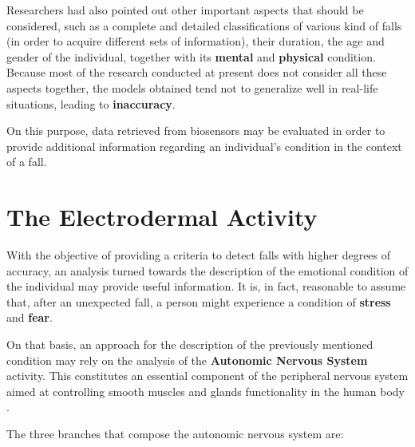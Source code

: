 
Researchers had also pointed out other important aspects that should be considered, such as a complete and detailed classifications of various kind of falls (in order to acquire different sets of information), their duration, the age and gender of the individual, together with its \textbf{mental} and \textbf{physical} condition.
Because most of the research conducted at present does not consider all these aspects together, the models obtained tend not to generalize well in real-life situations, leading to \textbf{inaccuracy}.

On this purpose, data retrieved from biosensors may be evaluated in order to provide additional information regarding an individual's condition in the context of a fall.

\section{The Electrodermal Activity}\label{sec:edaintro}

With the objective of providing a criteria to detect falls with higher degrees of accuracy, an analysis turned towards the description of the emotional condition of the individual may provide useful information. It is, in fact, reasonable to assume that, after an unexpected fall, a person might experience a condition of \textbf{stress} and \textbf{fear}.

On that basis, an approach for the description of the previously mentioned condition may rely on the analysis of the \textbf{Autonomic Nervous System} activity. This constitutes an essential component of the peripheral nervous system aimed at controlling smooth muscles and glands functionality in the human body \cite{ansWiki}.

The three branches that compose the autonomic nervous system are:

